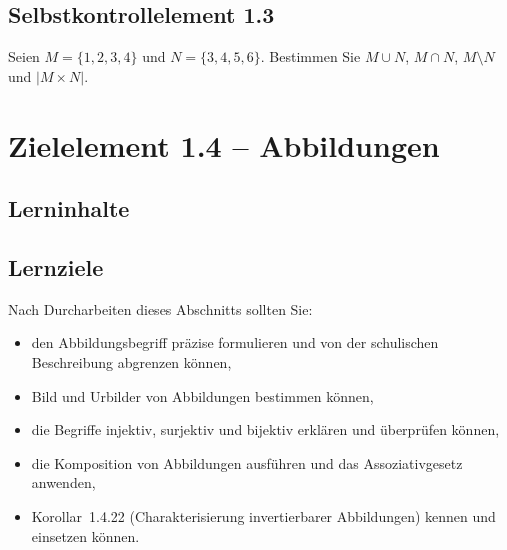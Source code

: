 \documentclass[a4paper,12pt]{article}
\begin{document}
\subsection*{Selbstkontrollelement 1.3}

Seien $M = \{1,2,3,4\}$ und $N = \{3,4,5,6\}$.
Bestimmen Sie $M \cup N$, $M \cap N$, $M \setminus N$ und $|M \times N|$.

\newpage

\section*{Zielelement 1.4 -- Abbildungen}

\subsection*{Lerninhalte}

\begin{center}
\end{center}

\subsection*{Lernziele}

Nach Durcharbeiten dieses Abschnitts sollten Sie:
\begin{itemize}
  \item den Abbildungsbegriff präzise formulieren und von der schulischen
        Beschreibung abgrenzen können,
  \item Bild und Urbilder von Abbildungen bestimmen können,
  \item die Begriffe injektiv, surjektiv und bijektiv erklären und überprüfen können,
  \item die Komposition von Abbildungen ausführen und das Assoziativgesetz anwenden,
  \item Korollar~1.4.22 (Charakterisierung invertierbarer Abbildungen) kennen und
        einsetzen können.
\end{itemize}
\end{document}

